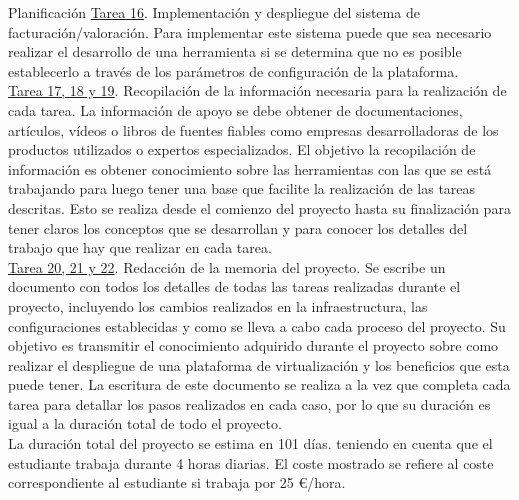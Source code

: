 \begin{chapter}{Planificación}
\underline{Tarea 16}. Implementación y despliegue del sistema de facturación/valoración. Para implementar este sistema puede que sea necesario realizar el desarrollo de una herramienta si se determina que no es posible establecerlo a través de los parámetros de configuración de la plataforma. \\

\underline{Tarea 17, 18 y 19}. Recopilación de la información necesaria para la realización de cada tarea. La información de apoyo se debe obtener de documentaciones, artículos, vídeos o libros de  fuentes fiables como empresas desarrolladoras de los productos utilizados o expertos especializados. El objetivo la recopilación de información es obtener conocimiento sobre las herramientas con las que se está trabajando para luego tener una base que facilite la realización de las tareas descritas. Esto se realiza desde el comienzo del proyecto hasta su finalización para tener claros los conceptos que se desarrollan y para conocer los detalles del trabajo que hay que realizar en cada tarea.\\

\underline{Tarea 20, 21 y 22}. Redacción de la memoria del proyecto. Se escribe un documento con todos los detalles de todas las tareas realizadas durante el proyecto, incluyendo los cambios realizados en la infraestructura, las configuraciones establecidas y como se lleva a cabo cada proceso del proyecto. Su objetivo es transmitir el conocimiento adquirido durante el proyecto sobre como realizar el despliegue de una plataforma de virtualización y los beneficios que esta puede tener. La escritura de este documento se realiza a la vez que completa cada tarea para detallar los pasos realizados en cada caso, por lo que su duración es igual a la duración total de todo el proyecto.\\


La duración total del proyecto se estima en 101 días. teniendo en cuenta que el estudiante trabaja durante 4 horas diarias. El coste mostrado se refiere al coste correspondiente al estudiante si trabaja por 25 €/hora. 


\end{chapter}
